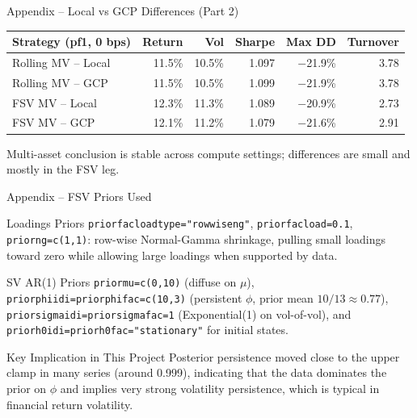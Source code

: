 \documentclass[10pt]{beamer}\usepackage[]{graphicx}\usepackage[table]{xcolor}
\begin{document}

\begin{frame}{Appendix -- Local vs GCP Differences (Part 2)}
  {\scriptsize
  \setlength{\tabcolsep}{4pt}
  \begin{tabular}{@{}lrrrrr@{}}
    \toprule
    \textbf{Strategy (pf1, 0 bps)} & \textbf{Return} & \textbf{Vol} & \textbf{Sharpe} & \textbf{Max DD} & \textbf{Turnover} \\
    \midrule
    Rolling MV -- Local & 11.5\% & 10.5\% & 1.097 & $-$21.9\% & 3.78 \\
    Rolling MV -- GCP   & 11.5\% & 10.5\% & 1.099 & $-$21.9\% & 3.78 \\
    FSV MV -- Local     & 12.3\% & 11.3\% & 1.089 & $-$20.9\% & 2.73 \\
    FSV MV -- GCP       & 12.1\% & 11.2\% & 1.079 & $-$21.6\% & 2.91 \\
    \bottomrule
  \end{tabular}
  }

  \vspace{0.5em}
  {\footnotesize Multi-asset conclusion is stable across compute settings; differences are small and mostly in the FSV leg.}
\end{frame}


\begin{frame}{Appendix -- FSV Priors Used}

  \vspace{0.2em}
  \begin{block}{Loadings Priors}
  {\scriptsize
  \texttt{priorfacloadtype="rowwiseng"}, \texttt{priorfacload=0.1}, \texttt{priorng=c(1,1)}:
  row-wise Normal-Gamma shrinkage, pulling small loadings toward zero while allowing large loadings when supported by data.}
  \end{block}

  \vspace{-0.2em}
  \begin{block}{SV AR(1) Priors}
  {\scriptsize
  \texttt{priormu=c(0,10)} (diffuse on $\mu$), \texttt{priorphiidi=priorphifac=c(10,3)} (persistent $\phi$, prior mean $10/13\approx0.77$),
  \texttt{priorsigmaidi=priorsigmafac=1} (Exponential(1) on vol-of-vol),
  and \texttt{priorh0idi=priorh0fac="stationary"} for initial states.}
  \end{block}

  \vspace{-0.2em}
  \begin{alertblock}{Key Implication in This Project}
  {\scriptsize
  Posterior persistence moved close to the upper clamp in many series (around 0.999), indicating that the data dominates the prior on $\phi$ and implies very strong volatility persistence, which is typical in financial return volatility.}
  \end{alertblock}

\end{frame}
\end{document}
